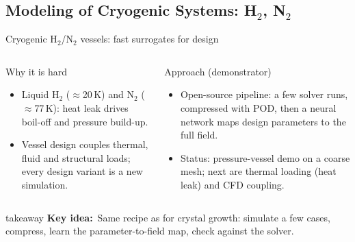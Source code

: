 \documentclass[aspectratio=169,10pt,t]{beamer}
\newcommand{\takeaway}[1]{%
  \par\vfill
  \begin{beamercolorbox}[wd=\linewidth,sep=5pt,rounded=true]{takeaway}
    \small\textcolor{qblue}{\textbf{Key idea:}}~#1
  \end{beamercolorbox}\vspace{1mm}}
\begin{document}
\begin{frame}
\section{Modeling of Cryogenic Systems: H$_2$, N$_2$}
\begin{frame}{Cryogenic H$_2$/N$_2$ vessels: fast surrogates for design}
\begin{columns}[T,onlytextwidth]
\begin{block}{Why it is hard}
\begin{itemize}\footnotesize
  \item Liquid H$_2$ ($\approx$20\,K) and N$_2$ ($\approx$77\,K): heat leak drives boil-off and pressure build-up.
  \item Vessel design couples thermal, fluid and structural loads; every design variant is a new simulation.
\end{itemize}
\end{block}
\begin{block}{Approach (demonstrator)}
\begin{itemize}\footnotesize
  \item Open-source pipeline: a few solver runs, compressed with POD, then a neural network maps design parameters to the full field.
  \item Status: pressure-vessel demo on a coarse mesh; next are thermal loading (heat leak) and CFD coupling.
\end{itemize}
\end{block}
\centering
{}
\end{columns}
\takeaway{Same recipe as for crystal growth: simulate a few cases, compress, learn the parameter-to-field map, check against the solver.}
\end{frame}


\end{frame}
\end{document}
